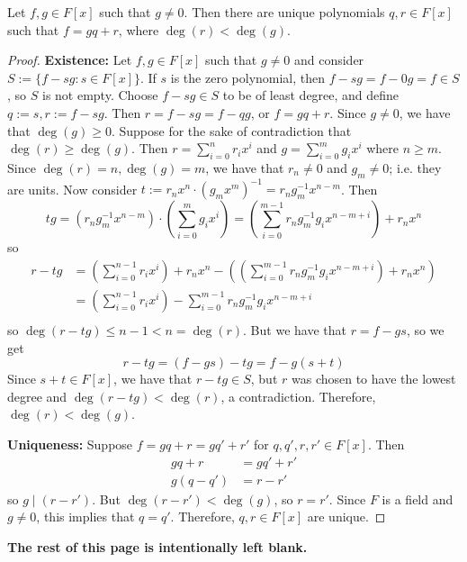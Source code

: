 \documentclass [12pt]{article}
\newcounter{thmcounter}[section]
\renewcommand{\thethmcounter}{\thesection.\arabic{thmcounter}}
\newenvironment{theorem}[1]{
  \refstepcounter{thmcounter}
  \begin{tcolorbox}[title={Theorem \thethmcounter: #1}, colback=green!5!white, colframe=black!75!green]
}{ \end{tcolorbox} }
\renewcommand{\bf}[1]{\textbf{{#1}}}
\begin{document}
\newpage
\begin{theorem}{(Division Algorithm [Polynomials])}
    Let $f, g \in F[x]$ such that $g \neq 0$. Then there are unique polynomials $q, r \in F[x]$ such
    that $f = gq + r$, where $\deg(r) < \deg(g)$.
\end{theorem}
\begin{proof}
    \bf{Existence:}
    Let $f, g \in F[x]$ such that $g \neq 0$ and consider $S := \{ f - sg : s \in F[x] \}$. If $s$
    is the zero polynomial, then $f - sg = f - 0g = f \in S$, so $S$ is not empty.
    Choose $f - sg \in S$ to be of least degree, and define $q := s, r := f - sg$. Then
    $r = f - sg = f - qg$, or $f = gq + r$. Since $g \neq 0$, we have that $\deg(g) \geq 0$. Suppose
    for the sake of contradiction that $\deg(r) \geq \deg(g)$. Then
    $r = \sum\limits_{i = 0}^{n} r_i x^i$ and $g = \sum\limits_{i = 0}^{m} g_i x^i$ where $n \geq m$.
    Since $\deg(r) = n, \deg(g) = m$, we have that  $r_n \neq 0$ and $g_m \neq 0$;
    i.e. they are units. Now consider
    $t := r_n x^n \cdot (g_m x^m)^{-1} = r_n g_m^{-1} x^{n - m}$. Then
    \[
        tg = \left(r_n g_m^{-1} x^{n - m}\right) \cdot \left(\sum\limits_{i = 0}^{m} g_i x^i\right)
        =
        \left(\sum\limits_{i = 0}^{m - 1} r_n g_m^{-1} g_i x^{n - m + i}\right) +
        r_n x^n
    \]
    so
    \begin{align*}
        r - tg &= \left(\sum\limits_{i = 0}^{n - 1} r_i x^i\right) + r_n x^n -
        \left(\left(\sum\limits_{i = 0}^{m - 1} r_n g_m^{-1} g_i x^{n - m + i}\right) +
        r_n x^n\right) \\
               &= \left(\sum\limits_{i = 0}^{n - 1} r_i x^i\right) -
               \sum\limits_{i = 0}^{m - 1} r_n g_m^{-1} g_i x^{n - m + i} \\
    \end{align*}
    so $\deg(r - tg) \leq n - 1 < n = \deg(r)$. But we have that
    $r = f - gs$, so we get
    \[
        r - tg = (f - gs) - tg = f - g(s + t)
    \]
    Since $s + t \in F[x]$, we have that $r - tg \in S$, but $r$ was chosen to have the lowest
    degree and $\deg(r - tg) < \deg(r)$, a contradiction. Therefore, $\deg(r) < \deg(g)$.
    \vspace{0.5em}

    \bf{Uniqueness:} Suppose $f = gq + r = gq' + r'$ for $q, q', r, r' \in F[x]$. Then
    \begin{align*}
        gq + r &= gq' + r' \\
        g(q - q') &= r - r'
    \end{align*}
    so $g \mid (r - r')$. But $\deg(r - r') < \deg(g)$, so $r = r'$. Since $F$ is a field and $g
    \neq 0$, this implies that $q = q'$. Therefore, $q, r \in F[x]$ are unique.
\end{proof}
\begin{center}
    \vspace{5em}
    \bf{The rest of this page is intentionally left blank.}
\end{center}
\end{document}

